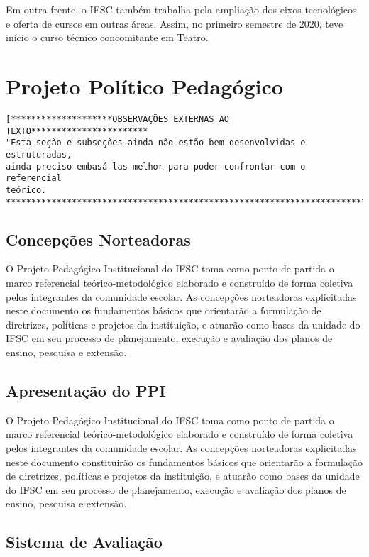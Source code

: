 Em outra frente, o IFSC também trabalha pela ampliação dos eixos tecnológicos e oferta de cursos em outras áreas. Assim, no primeiro semestre de 2020, teve início o curso técnico concomitante em Teatro.

\section{Projeto Político Pedagógico}
\begin{verbatim}
[********************OBSERVAÇÕES EXTERNAS AO TEXTO***********************
"Esta seção e subseções ainda não estão bem desenvolvidas e estruturadas,
ainda preciso embasá-las melhor para poder confrontar com o referencial
teórico.
*************************************************************************]
\end{verbatim}

\subsection{Concepções Norteadoras}
O Projeto Pedagógico Institucional do IFSC toma como ponto de partida o marco referencial teórico-metodológico elaborado e construído de forma coletiva pelos integrantes da comunidade escolar. As concepções norteadoras explicitadas neste documento os fundamentos básicos que orientarão a formulação de diretrizes, políticas e projetos da instituição, e atuarão como bases da unidade do IFSC em seu processo de planejamento, execução e avaliação dos planos de ensino, pesquisa e extensão.
\subsection{Apresentação do PPI}
O Projeto Pedagógico Institucional do IFSC toma como ponto de partida o marco referencial teórico-metodológico elaborado e construído de forma coletiva pelos integrantes da comunidade escolar. As concepções norteadoras explicitadas neste documento constituirão os fundamentos básicos que orientarão a formulação de diretrizes, políticas e projetos da instituição, e atuarão como bases da unidade do IFSC em seu processo de planejamento, execução e avaliação dos planos de ensino, pesquisa e extensão. \cite{IFSC:2020}
\subsection{Sistema de Avaliação}